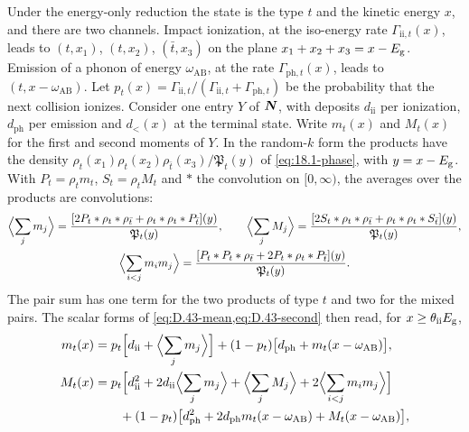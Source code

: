 Under the energy-only reduction the state is the type $t$ and the kinetic energy $x$, and there are two channels. Impact ionization, at the iso-energy rate $\varGamma_{\mathrm{ii},t}(x)$, leads to $(t, x_1)$, $(t, x_2)$, $(\bar t, x_3)$ on the plane $x_1 + x_2 + x_3 = x - E_{\mathrm{g}}$. Emission of a phonon of energy $\omega_{\mathrm{AB}}$, at the rate $\varGamma_{\mathrm{ph},t}(x)$, leads to $(t, x - \omega_{\mathrm{AB}})$. Let $p_t(x) = \varGamma_{\mathrm{ii},t}/(\varGamma_{\mathrm{ii},t} + \varGamma_{\mathrm{ph},t})$ be the probability that the next collision ionizes. Consider one entry $Y$ of $\bm{N}$, with deposits $d_{\mathrm{ii}}$ per ionization, $d_{\mathrm{ph}}$ per emission and $d_<(x)$ at the terminal state. Write $m_t(x)$ and $M_t(x)$ for the first and second moments of $Y$. In the random-$k$ form the products have the density $\rho_t(x_1)\rho_t(x_2)\rho_{\bar t}(x_3)/\mathfrak{P}_t(y)$ of \cref{eq:18.1-phase}, with $y = x - E_{\mathrm{g}}$. With $P_t = \rho_tm_t$, $S_t = \rho_tM_t$ and $*$ the convolution on $[0, \infty)$, the averages over the products are convolutions:
\begin{gather*}
  \Bigl\langle\sum_jm_j\Bigr\rangle = \frac{[2P_t*\rho_t*\rho_{\bar t} + \rho_t*\rho_t*P_{\bar t}](y)}{\mathfrak{P}_t(y)} , \qquad
  \Bigl\langle\sum_jM_j\Bigr\rangle = \frac{[2S_t*\rho_t*\rho_{\bar t} + \rho_t*\rho_t*S_{\bar t}](y)}{\mathfrak{P}_t(y)} , \\
  \Bigl\langle\sum_{i<j}m_im_j\Bigr\rangle = \frac{[P_t*P_t*\rho_{\bar t} + 2P_t*\rho_t*P_{\bar t}](y)}{\mathfrak{P}_t(y)} .
\end{gather*}
The pair sum has one term for the two products of type $t$ and two for the mixed pairs. The scalar forms of \cref{eq:D.43-mean,eq:D.43-second} then read, for $x \ge \theta_{\mathrm{ii}}E_{\mathrm{g}}$,
\begin{align}
  m_t(x) &= p_t\Bigl[d_{\mathrm{ii}} + \Bigl\langle\sum_jm_j\Bigr\rangle\Bigr] + (1 - p_t)\bigl[d_{\mathrm{ph}} + m_t(x - \omega_{\mathrm{AB}})\bigr] ,
  \label{eq:D.43-m1}\\
  M_t(x) &= p_t\Bigl[d_{\mathrm{ii}}^2 + 2d_{\mathrm{ii}}\Bigl\langle\sum_jm_j\Bigr\rangle + \Bigl\langle\sum_jM_j\Bigr\rangle + 2\Bigl\langle\sum_{i<j}m_im_j\Bigr\rangle\Bigr] \nonumber\\
  &\qquad + (1 - p_t)\bigl[d_{\mathrm{ph}}^2 + 2d_{\mathrm{ph}}m_t(x - \omega_{\mathrm{AB}}) + M_t(x - \omega_{\mathrm{AB}})\bigr] ,
  \label{eq:D.43-m2}
\end{align}
